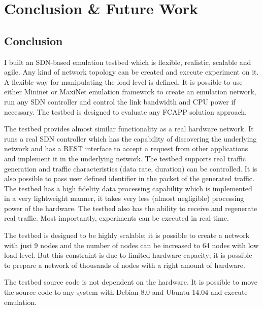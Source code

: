 \newpage
\thispagestyle{empty}
\mbox{}


\chapter{Conclusion \& Future Work} \label{CONC-CHAP}

\section{Conclusion}
I built an SDN-based emulation testbed which is flexible, realistic, scalable and agile. Any kind of network topology can be created and execute experiment on it. A flexible way for manipulating the load level is defined. It is possible to use either Mininet or MaxiNet emulation framework to create an emulation network, run any SDN controller and control the link bandwidth and CPU power if necessary. The testbed is designed to evaluate any FCAPP solution approach.

The testbed provides almost similar functionality as a real hardware network. It runs a real SDN controller which has the capability of discovering the underlying network and has a REST interface to accept a request from other applications and implement it in the underlying network. The testbed supports real traffic generation and traffic characteristics (data rate, duration) can be controlled. It is also possible to pass user defined identifier in the packet of the generated traffic. The testbed has a high fidelity data processing capability which is implemented in a very lightweight manner, it takes very less (almost negligible) processing power of the hardware. The testbed also has the ability to receive and regenerate real traffic. Most importantly, experiments can be executed in real time.

The testbed is designed to be highly scalable; it is possible to create a network with just 9 nodes and the number of nodes can be increased to 64 nodes with low load level. But this constraint is due to limited hardware capacity; it is possible to prepare a network of thousands of nodes with a right amount of hardware.

The testbed source code is not dependent on the hardware. It is possible to move the source code to any system with Debian 8.0 and Ubuntu 14.04 and execute emulation.

